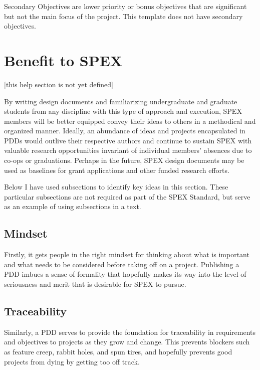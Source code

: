 \documentclass[journal]{SPEXformat}
\newenvironment{help}{
  \ttfamily\footnotesize\sloppy
  \begin{lrbox}{\helpbox}\begin{minipage}{\linewidth}
  }{
  \end{minipage}\end{lrbox}
  \ifbool{showhelp}{
    \fbox{\usebox{\helpbox}}
  }{}
}
\begin{document}

\begin{help}
  Secondary Objectives are lower priority or bonus objectives that are significant but not the main focus of the project. This template does not have secondary objectives.
\end{help}

\section{Benefit to SPEX}
\label{sec:benefit}
\begin{help}
  [this help section is not yet defined]
\end{help}

By writing design documents and familiarizing undergraduate and graduate students from any discipline with this type of approach and execution, SPEX members will be better equipped convey their ideas to others in a methodical and organized manner.
Ideally, an abundance of ideas and projects encapsulated in PDDs would outlive their respective authors and continue to sustain SPEX with valuable research opportunities invariant of individual members' absences due to co-ops or graduations.
Perhaps in the future, SPEX design documents may be used as baselines for grant applications and other funded research efforts.

\begin{help}
  Below I have used subsections to identify key ideas in this section. These particular subsections are not required as part of the SPEX Standard, but serve as an example of using subsections in a text.
\end{help}

\subsection{Mindset}
\label{subsec:mindset}
Firstly, it gets people in the right mindset for thinking about what is important and what needs to be considered before taking off on a project.
Publishing a PDD imbues a sense of formality that hopefully makes its way into the level of seriousness and merit that is desirable for SPEX to pursue.

\subsection{Traceability}
\label{subsec:traceability}
Similarly, a PDD serves to provide the foundation for traceability in requirements and objectives to projects as they grow and change.
This prevents blockers such as feature creep, rabbit holes, and spun tires, and hopefully prevents good projects from dying by getting too off track.
\end{document}
